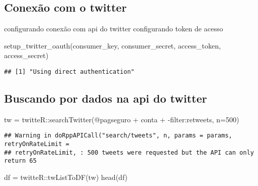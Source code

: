 \documentclass[
]{article}
\newenvironment{Shaded}{\begin{snugshade}}{\end{snugshade}}
\newcommand{\AttributeTok}[1]{\textcolor[rgb]{0.77,0.63,0.00}{#1}}
\newcommand{\DecValTok}[1]{\textcolor[rgb]{0.00,0.00,0.81}{#1}}
\newcommand{\FunctionTok}[1]{\textcolor[rgb]{0.00,0.00,0.00}{#1}}
\newcommand{\NormalTok}[1]{#1}
\newcommand{\OtherTok}[1]{\textcolor[rgb]{0.56,0.35,0.01}{#1}}
\newcommand{\SpecialCharTok}[1]{\textcolor[rgb]{0.00,0.00,0.00}{#1}}
\newcommand{\StringTok}[1]{\textcolor[rgb]{0.31,0.60,0.02}{#1}}
\begin{document}
\hypertarget{conexuxe3o-com-o-twitter}{%
\subsection{Conexão com o twitter}\label{conexuxe3o-com-o-twitter}}

configurando conexão com api do twitter configurando token de acesso

\begin{Shaded}
\begin{Highlighting}[]
\FunctionTok{setup\_twitter\_oauth}\NormalTok{(consumer\_key, consumer\_secret, access\_token, access\_secret)}
\end{Highlighting}
\end{Shaded}

\begin{verbatim}
## [1] "Using direct authentication"
\end{verbatim}

\hypertarget{buscando-por-dados-na-api-do-twitter}{%
\subsection{Buscando por dados na api do
twitter}\label{buscando-por-dados-na-api-do-twitter}}

\begin{Shaded}
\begin{Highlighting}[]
\NormalTok{tw }\OtherTok{=}\NormalTok{ twitteR}\SpecialCharTok{::}\FunctionTok{searchTwitter}\NormalTok{(}\StringTok{\textquotesingle{}@pagseguro + conta + {-}filter:retweets\textquotesingle{}}\NormalTok{, }\AttributeTok{n=}\DecValTok{500}\NormalTok{)}
\end{Highlighting}
\end{Shaded}

\begin{verbatim}
## Warning in doRppAPICall("search/tweets", n, params = params, retryOnRateLimit =
## retryOnRateLimit, : 500 tweets were requested but the API can only return 65
\end{verbatim}

\begin{Shaded}
\begin{Highlighting}[]
\NormalTok{df }\OtherTok{=}\NormalTok{ twitteR}\SpecialCharTok{::}\FunctionTok{twListToDF}\NormalTok{(tw)}
\FunctionTok{head}\NormalTok{(df)}
\end{Highlighting}
\end{Shaded}
\end{document}
